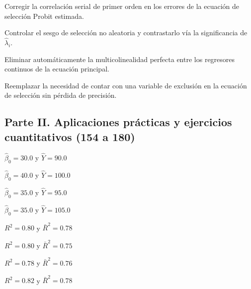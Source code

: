 \begin{opts}
    \item Corregir la correlación serial de primer orden en los errores de la ecuación de selección Probit estimada.
    \item Controlar el sesgo de selección no aleatoria y contrastarlo vía la significancia de $\hat{\lambda}_i$.
    \item Eliminar automáticamente la multicolinealidad perfecta entre los regresores continuos de la ecuación principal.
    \item Reemplazar la necesidad de contar con una variable de exclusión en la ecuación de selección sin pérdida de precisión.
\end{opts}

\subsection*{Parte II. Aplicaciones prácticas y ejercicios cuantitativos (154 a 180)}

\begin{opts}
    \item $\hat{\beta}_0 = 30.0$ y $\hat{Y} = 90.0$
    \item $\hat{\beta}_0 = 40.0$ y $\hat{Y} = 100.0$
    \item $\hat{\beta}_0 = 35.0$ y $\hat{Y} = 95.0$
    \item $\hat{\beta}_0 = 35.0$ y $\hat{Y} = 105.0$
\end{opts}

\begin{opts}
    \item $R^2 = 0.80$ y $\bar{R}^2 = 0.78$
    \item $R^2 = 0.80$ y $\bar{R}^2 = 0.75$
    \item $R^2 = 0.78$ y $\bar{R}^2 = 0.76$
    \item $R^2 = 0.82$ y $\bar{R}^2 = 0.78$
\end{opts}

